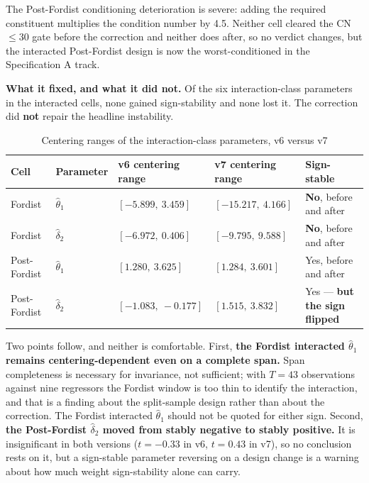 \documentclass[11pt,a4paper]{article}
\begin{document}
The Post-Fordist conditioning deterioration is severe: adding the required constituent multiplies the condition number by 4.5. Neither cell cleared the CN $\le 30$ gate before the correction and neither does after, so no verdict changes, but the interacted Post-Fordist design is now the worst-conditioned in the Specification A track.

\textbf{What it fixed, and what it did not.} Of the six interaction-class parameters in the interacted cells, none gained sign-stability and none lost it. The correction did \textbf{not} repair the headline instability.

\begin{table}[H]
\centering
\caption{Centering ranges of the interaction-class parameters, v6 versus v7}
\label{tab:specA_span_stability}
\small
\begin{tabular}{p{2.6cm}p{1.9cm}p{3.4cm}p{3.4cm}p{2.8cm}}
\toprule
Cell & Parameter & v6 centering range & v7 centering range & Sign-stable \\
\midrule
Fordist & $\hat{\theta}_1$ & $[-5.899,\ 3.459]$ & $[-15.217,\ 4.166]$ & \textbf{No}, before and after \\
Fordist & $\hat{\delta}_2$ & $[-6.972,\ 0.406]$ & $[-9.795,\ 9.588]$ & \textbf{No}, before and after \\
Post-Fordist & $\hat{\theta}_1$ & $[1.280,\ 3.625]$ & $[1.284,\ 3.601]$ & Yes, before and after \\
Post-Fordist & $\hat{\delta}_2$ & $[-1.083,\ -0.177]$ & $[1.515,\ 3.832]$ & Yes --- \textbf{but the sign flipped} \\
\bottomrule
\end{tabular}
\end{table}

Two points follow, and neither is comfortable. First, \textbf{the Fordist interacted $\hat{\theta}_1$ remains centering-dependent even on a complete span.} Span completeness is necessary for invariance, not sufficient; with $T = 43$ observations against nine regressors the Fordist window is too thin to identify the interaction, and that is a finding about the split-sample design rather than about the correction. The Fordist interacted $\hat{\theta}_1$ should not be quoted for either sign. Second, \textbf{the Post-Fordist $\hat{\delta}_2$ moved from stably negative to stably positive.} It is insignificant in both versions ($t = -0.33$ in v6, $t = 0.43$ in v7), so no conclusion rests on it, but a sign-stable parameter reversing on a design change is a warning about how much weight sign-stability alone can carry.
\end{document}

